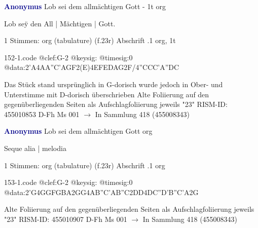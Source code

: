 \documentclass[twocolumn]{book}
\begin{document}
\newline \par \vspace{7pt} \textcolor{darkblue}{\textbf{Anonymus  }}
\newline Lob sei dem allmächtigen Gott - 1t
\newline org
\newline \begin{itshape}[f.23r, at left:] Lob seÿ den All | Mächtigen | Gott.\end{itshape} 
\newline \textcolor{darkblue}{}  1 Stimmen: org (tabulature)  (f.23r)
\newline Abschrift
.1  org, 1t  
\begin{filecontents*}{152-1.code}
@clef:G-2
@keysig:
@timesig:0
@data:2'A4AA''C'AGF2(E)4EFEDAG2F/4''CCC'A''DC
\end{filecontents*}
\newline
%
\newline Das Stück stand ursprünglich in G-dorisch wurde jedoch in Ober- und Unterstimme mit D-dorisch überschrieben
\newline Alte Foliierung auf den gegenüberliegenden Seiten als Aufschlagfoliierung jeweils "23"
\newline RISM-ID: 455010853
\newline D-Fh  Ms 001
\newline $\rightarrow$ In Sammlung 418 (455008343)
      
\newline \par \vspace{7pt} \textcolor{darkblue}{\textbf{Anonymus  }}
\newline Lob sei dem allmächtigen Gott
\newline org
\newline \begin{itshape}[f.23r, at right:] Seque alia | melodia\end{itshape} 
\newline \textcolor{darkblue}{}  1 Stimmen: org (tabulature)  (f.23r)
\newline Abschrift
.1  org  
\begin{filecontents*}{153-1.code}
@clef:G-2
@keysig:
@timesig:0
@data:2'G4GGFGBA2GG4AB''C'AB''C2DD4DC''D'B''C'A2G
\end{filecontents*}
\newline
%
\newline Alte Foliierung auf den gegenüberliegenden Seiten als Aufschlagfoliierung jeweils "23"
\newline RISM-ID: 455010907
\newline D-Fh  Ms 001
\newline $\rightarrow$ In Sammlung 418 (455008343)
      
\end{document}
